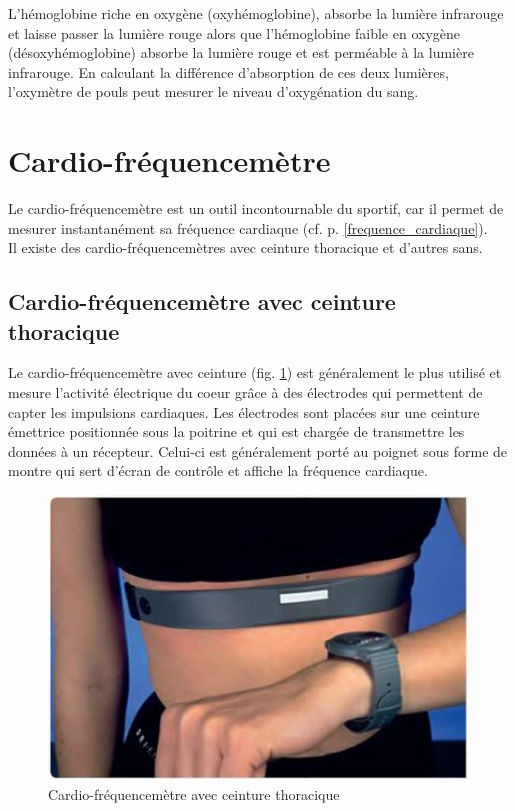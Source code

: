    L’hémoglobine riche en oxygène (oxyhémoglobine), absorbe la lumière infrarouge et laisse passer la lumière rouge alors que l’hémoglobine faible en oxygène (désoxyhémoglobine) absorbe la lumière rouge et est perméable à la lumière infrarouge. En calculant la différence d’absorption de ces deux lumières, l’oxymètre de pouls peut mesurer le niveau d’oxygénation du sang.

       
    \vspace{10pt}
     
    \section{Cardio-fréquencemètre}
    
        Le cardio-fréquencemètre est un outil incontournable du sportif, car il permet de mesurer instantanément sa fréquence cardiaque (cf. p.\pageref{frequence_cardiaque}  \ref{frequence_cardiaque}). \\
        
        Il existe des cardio-fréquencemètres avec ceinture thoracique et d'autres sans. 
        
        \subsection{Cardio-fréquencemètre avec ceinture thoracique}
        
            Le cardio-fréquencemètre avec ceinture (fig. \ref{fig:cardio_ceinture}) est généralement le plus utilisé et mesure l’activité électrique du coeur grâce à des électrodes qui permettent de capter les impulsions cardiaques. Les électrodes sont placées sur une ceinture émettrice positionnée sous la poitrine et qui est chargée de transmettre les données à un récepteur. Celui-ci est généralement porté au poignet sous forme de montre qui sert d'écran de contrôle et affiche la fréquence cardiaque.
            
            \begin{figure}[H]
                \centering
                \includegraphics[scale=0.5]{images/cardio-ceinture2.jpg}
                \caption{\label{fig:cardio_ceinture}Cardio-fréquencemètre avec ceinture thoracique}
            \end{figure}
        
